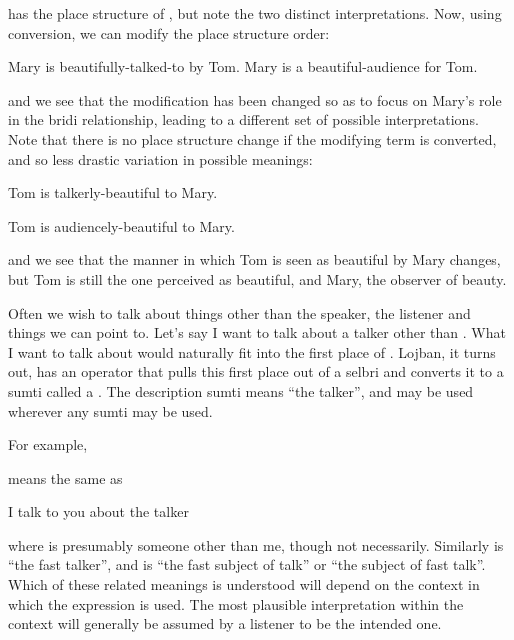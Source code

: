 {\noindent}has the place structure of , but note the two distinct interpretations.  Now, using conversion, we can modify the place structure order:
\begin{example}
   \n
Mary is beautifully-talked-to by Tom.\n
Mary is a beautiful-audience for Tom.
\end{example}

{\noindent}and we see that the modification has been changed so as to focus on Mary's role in the bridi relationship, leading to a different set of possible interpretations. Note that there is no place structure change if the modifying term is converted, and so less drastic variation in possible meanings:
\begin{example}
   \n
Tom is talkerly-beautiful to Mary.
\end{example}

\begin{example}
   \n
Tom is audiencely-beautiful to Mary.
\end{example}

{\noindent}and we see that the manner in which Tom is seen as beautiful by Mary changes, but Tom is still the one perceived as beautiful, and Mary, the observer of beauty.



Often we wish to talk about things other than the speaker, the listener and things we can point to. Let's say I want to talk about a talker other than . What I want to talk about would naturally fit into the first place of . Lojban, it turns out, has an operator that pulls this first place out of a selbri and converts it to a sumti called a . The description sumti  means ``the talker'', and may be used wherever any sumti may be used.

For example,
\begin{example}
   
\end{example}

{\noindent}means the same as
\begin{example}
I talk to you about the talker
\end{example}

{\noindent}where  is presumably someone other than me, though not necessarily. Similarly  is ``the fast talker'', and  is ``the fast subject of talk'' or ``the subject of fast talk''. Which of these related meanings is understood will depend on the context in which the expression is used. The most plausible interpretation within the context will generally be assumed by a listener to be the intended one.

